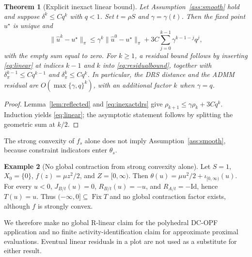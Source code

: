 \documentclass[preprint,12pt,3p]{elsarticle}
\newtheorem{theorem}{Theorem}[section]
\theoremstyle{definition}
\newtheorem{example}[theorem]{Example}
\begin{document}
\begin{theorem}[Explicit inexact linear bound]\label{thm:linear}
Let Assumption~\ref{ass:smooth} hold and suppose $\delta^k\leq Cq^k$ with $q<1$. Set $t=\rho S$ and $\gamma=\gamma(t)$. Then the fixed point $u^\star$ is unique and
\begin{equation}
\|\widehat u^k-u^\star\|_\pi\leq\gamma^k\|\widehat u^0-u^\star\|_\pi
+3C\sum_{j=0}^{k-1}\gamma^{k-1-j}q^j,
\label{eq:linear}
\end{equation}
with the empty sum equal to zero. For $k\geq1$, a residual bound follows by inserting \eqref{eq:linear} at indices $k-1$ and $k$ into \eqref{eq:residualbound}, together with $\delta_\pi^{k-1}\leq Cq^{k-1}$ and $\delta_\pi^k\leq Cq^k$. In particular, the DRS distance and the ADMM residual are $O(\max\{\gamma,q\}^k)$, with an additional factor $k$ when $\gamma=q$.
\end{theorem}
\begin{proof}
Lemma~\ref{lem:reflected} and \eqref{eq:inexactdrs} give $\rho_{k+1}\leq\gamma\rho_k+3Cq^k$. Induction yields \eqref{eq:linear}; the asymptotic statement follows by splitting the geometric sum at $k/2$.
\end{proof}
The strong convexity of $f_s$ alone does not imply Assumption~\ref{ass:smooth}, because constraint indicators enter $\theta_s$.

\begin{example}[No global contraction from strong convexity alone]\label{ex:noglobal}
Let $S=1$, $X_0=\{0\}$, $f(z)=\mu z^2/2$, and $Z=[0,\infty)$. Then $\theta(u)=\mu u^2/2+\iota_{[0,\infty)}(u)$. For every $u<0$, $J_{B/t}(u)=0$, $R_{B/t}(u)=-u$, and $R_{A/t}=-\mathrm{Id}$, hence $T(u)=u$. Thus $(-\infty,0]\subseteq\operatorname{Fix}T$ and no global contraction factor exists, although $f$ is strongly convex.
\end{example}
We therefore make no global R-linear claim for the polyhedral DC-OPF application and no finite activity-identification claim for approximate proximal evaluations. Eventual linear residuals in a plot are not used as a substitute for either result.
\end{document}
